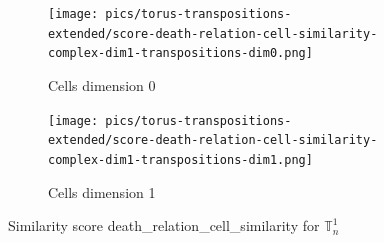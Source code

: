 \documentclass{article}
\begin{document}
\begin{figure}[htbp]
\centering
\begin{subfigure}[b]{0.45\textwidth}
    \texttt{[image: pics/torus-transpositions-extended/score-death-relation-cell-similarity-complex-dim1-transpositions-dim0.png]}
    \caption{Cells dimension 0}
    \label{fig:deathrelationcellsimilaritycomplex1cells0}
\end{subfigure}
\hfill
\begin{subfigure}[b]{0.45\textwidth}
    \texttt{[image: pics/torus-transpositions-extended/score-death-relation-cell-similarity-complex-dim1-transpositions-dim1.png]}
    \caption{Cells dimension 1}
    \label{fig:deathrelationcellsimilaritycomplex1cells1}
\end{subfigure}
\caption{Similarity score death\_relation\_cell\_similarity for $\mathbb{T}_n^{1}$}
\label{fig:deathrelationcellsimilaritycomplex1}
\end{figure}
\end{document}
